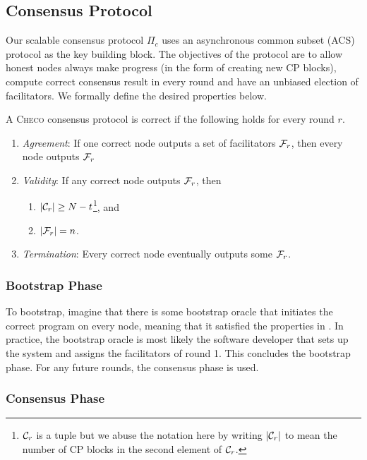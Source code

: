 \subsection{Consensus Protocol}
Our scalable consensus protocol $\Pi_c$ uses an asynchronous common subset (ACS) protocol as the key building block.
The objectives of the protocol are to
allow honest nodes always make progress (in the form of creating new CP blocks),
compute correct consensus result in every round
and have an unbiased election of facilitators.
We formally define the desired properties below.
\begin{definition}\label{def:consensus}
A \textsc{Checo} consensus protocol is correct if the following holds for every round $r$.
\begin{enumerate}
    \item \emph{Agreement}:
        If one correct node outputs a set of facilitators $\mathcal{F}_r$,
        then every node outputs $\mathcal{F}_r$
    \item \emph{Validity}:
        If any correct node outputs $\mathcal{F}_r$, then 
            \begin{enumerate}
                \item $|\mathcal{C}_r| \ge N - t$\footnote{
                $\mathcal{C}_r$ is a tuple but we abuse the notation here by writing $|\mathcal{C}_r|$ to mean the number of CP blocks in the second element of $\mathcal{C}_r$.}, and
                \item $|\mathcal{F}_r| = n$.
            \end{enumerate}
    \item \emph{Termination}:
        Every correct node eventually outputs some $\mathcal{F}_r$.
\end{enumerate}
\end{definition}

\subsubsection{Bootstrap Phase}
\label{sec:bootstrap}
To bootstrap, imagine that there is some bootstrap oracle that initiates the correct program on every node,
meaning that it satisfied the properties in .
In practice, the bootstrap oracle is most likely the software developer that sets up the system and assigns the facilitators of round 1.
This concludes the bootstrap phase.
For any future rounds, the consensus phase is used.

\subsubsection{Consensus Phase}
\label{sec:consensus-phase}

